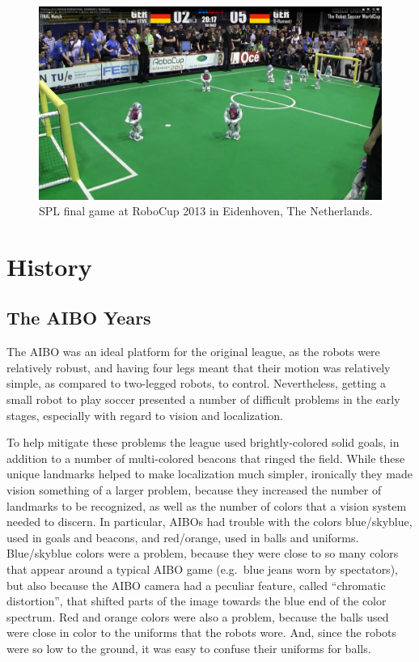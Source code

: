 \documentclass{llncs}
\begin{document}
\begin{figure}[t]
\centerline{
\includegraphics[width=1.0\columnwidth]{"spl2013"}
}
  \caption{SPL final game at RoboCup 2013 in Eidenhoven, The Netherlands.~\cite{botsport}}
  \label{spl2013}
\end{figure} 

\section{History}

\subsection{The AIBO Years}

The AIBO was
an ideal platform for the original league, as the robots were relatively robust,
and having four legs meant that their motion was relatively simple, as compared
to two-legged robots, to control. Nevertheless, getting a small robot to play
soccer presented a number of difficult problems in the early stages, especially
with regard to vision and localization.

To help mitigate these problems the league used brightly-colored solid goals, in addition
to a number of multi-colored beacons that ringed the field. While these unique
landmarks helped to make localization much simpler, ironically they made
vision something of a larger problem, because they increased the number of landmarks
to be recognized, as well as the number of colors that a vision system needed to
discern. In particular, AIBOs had trouble with the colors blue/skyblue, used in
goals and beacons, and red/orange, used in balls and uniforms. Blue/skyblue colors
were a problem, because they were close to so many colors that appear
around a typical AIBO game (e.g.~blue jeans worn by spectators), but also because
the AIBO camera had a peculiar feature, called ``chromatic distortion'', that
shifted parts of the image towards the blue end of the color spectrum. Red
and orange colors were also a problem, because the balls used were close in color to the
uniforms that the robots wore. And, since the robots were so low to the ground, it
was easy to confuse their uniforms for balls.
\end{document}
